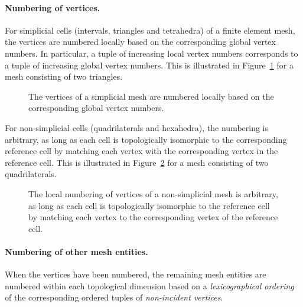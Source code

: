 \paragraph{Numbering of vertices.}

For simplicial cells (intervals, triangles and tetrahedra) of a finite
element mesh, the vertices are numbered locally based on the
corresponding global vertex numbers. In particular, a tuple of
increasing local vertex numbers corresponds to a tuple of increasing
global vertex numbers. This is illustrated in
Figure~\ref{fig:numbering_example_triangles} for a mesh consisting of
two triangles.

\begin{figure}
\bwfig
  \begin{center}
    \caption{The vertices of a simplicial mesh are numbered locally
      based on the corresponding global vertex numbers.}
    \label{fig:numbering_example_triangles}
  \end{center}
\end{figure}

For non-simplicial cells (quadrilaterals and hexahedra), the numbering
is arbitrary, as long as each cell is topologically isomorphic to the corresponding
reference cell by matching each vertex with the corresponding vertex
in the reference cell. This is illustrated in
Figure~\ref{fig:numbering_example_quadrilaterals} for a mesh
consisting of two quadrilaterals.

\begin{figure}
\bwfig
  \begin{center}
    \caption{The local numbering of vertices of a non-simplicial mesh
      is arbitrary, as long as each cell is topologically isomorphic
      to the reference cell by matching each vertex to the
      corresponding vertex of the reference cell.}
    \label{fig:numbering_example_quadrilaterals}
  \end{center}
\end{figure}

\paragraph{Numbering of other mesh entities.}

When the vertices have been numbered, the remaining mesh entities are
numbered within each topological dimension based on a
\emph{lexicographical ordering} of the corresponding ordered tuples of
\emph{non-incident vertices}.

